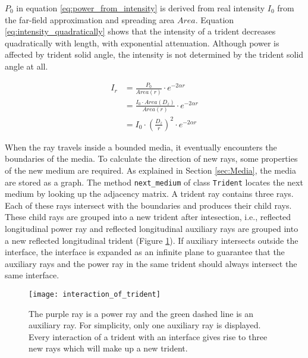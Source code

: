 $P_0$ in equation \ref{eq:power_from_intensity} is derived from real intensity $I_0$ from the far-field approximation and spreading area $Area$. Equation \ref{eq:intensity_quadratically} shows that the intensity of a trident decreases quadratically with length, with exponential attenuation. Although power is affected by trident solid angle, the intensity is not determined by the trident solid angle at all.

\begin{equation} \label{eq:intensity_quadratically}
    \begin{aligned}
        I_r &= \frac{P_0}{Area(r)} \cdot e^{-2 \alpha r} \\
        &= \frac{I_0 \cdot Area(D_z)}{Area(r)} \cdot e^{-2 \alpha r} \\
        &= I_0 \cdot \left(\frac{D_z}{r}\right)^2 \cdot e^{-2 \alpha r}
    \end{aligned}
\end{equation}

When the ray travels inside a bounded media, it eventually encounters the boundaries of the media. To calculate the direction of new rays, some properties of the new medium are required. As explained in Section \ref{sec:Media}, the media are stored as a graph. The method \texttt{next\_medium} of class \texttt{Trident} locates the next medium by looking up the adjacency matrix. A trident ray contains three rays. Each of these rays intersect with the boundaries and produces their child rays. These child rays are grouped into a new trident after intesection, i.e., reflected longitudinal power ray and reflected longitudinal auxiliary rays are grouped into a new reflected longitudinal trident (Figure \ref{fig:interaction_of_trident}). If auxiliary intersects outside the interface, the interface is expanded as an infinite plane to guarantee that the auxiliary rays and the power ray in the same trident should always intersect the same interface.

\begin{figure}[h]
    \centering
    \texttt{[image: interaction\_of\_trident]}
    \caption{The purple ray is a power ray and the green dashed line is an auxiliary ray. For simplicity, only one auxiliary ray is displayed. Every interaction of a trident with an interface gives rise to three new rays which will make up a new trident.}
    \label{fig:interaction_of_trident}
\end{figure}



